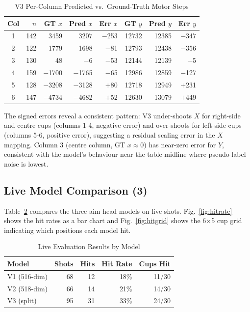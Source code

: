 \documentclass[conference]{IEEEtran}
\begin{document}
\begin{table}[ht]
\centering
\caption{V3 Per-Column Predicted vs.\ Ground-Truth Motor Steps}
\label{tab:percolumn}
\setlength{\tabcolsep}{4pt}
\begin{tabular}{crrrrrrr}
\toprule
Col & $n$ & GT $x$ & Pred $x$ & Err $x$ & GT $y$ & Pred $y$ & Err $y$ \\
\midrule
1 & 142 & 3459  & 3207  & $-$253 & 12732 & 12385 & $-$347 \\
2 & 122 & 1779  & 1698  & $-$81  & 12793 & 12438 & $-$356 \\
3 & 130 & 48    & $-$6  & $-$53  & 12144 & 12139 & $-$5   \\
4 & 159 & $-$1700 & $-$1765 & $-$65 & 12986 & 12859 & $-$127 \\
5 & 128 & $-$3208 & $-$3128 & $+$80 & 12718 & 12949 & $+$231 \\
6 & 147 & $-$4734 & $-$4682 & $+$52 & 12630 & 13079 & $+$449 \\
\bottomrule
\end{tabular}
\end{table}

The signed errors reveal a consistent pattern: V3 under-shoots $X$ for
right-side and centre cups (columns 1-4, negative error) and over-shoots for
left-side cups (columns 5-6, positive error), suggesting a residual scaling
error in the $X$ mapping.  Column 3 (centre column, GT $x \approx 0$) has
near-zero error for $Y$, consistent with the model's behaviour near the table
midline where pseudo-label noise is lowest.

\subsection{Live Model Comparison (3)}

Table~\ref{tab:live} compares the three aim head models on live shots.
Fig.~\ref{fig:hitrate} shows the hit rates as a bar chart and
Fig.~\ref{fig:hitgrid} shows the 6$\times$5 cup grid indicating which
positions each model hit.

\begin{table}[ht]
\centering
\caption{Live Evaluation Results by Model}
\label{tab:live}
\begin{tabular}{lrrrr}
\toprule
Model         & Shots & Hits & Hit Rate & Cups Hit \\
\midrule
V1 (516-dim)  & 68  & 12 & 18\% & 11/30 \\
V2 (518-dim)  & 66  & 14 & 21\% & 14/30 \\
V3 (split)    & 95  & 31 & 33\% & 24/30 \\
\bottomrule
\end{tabular}
\end{table}
\end{document}
